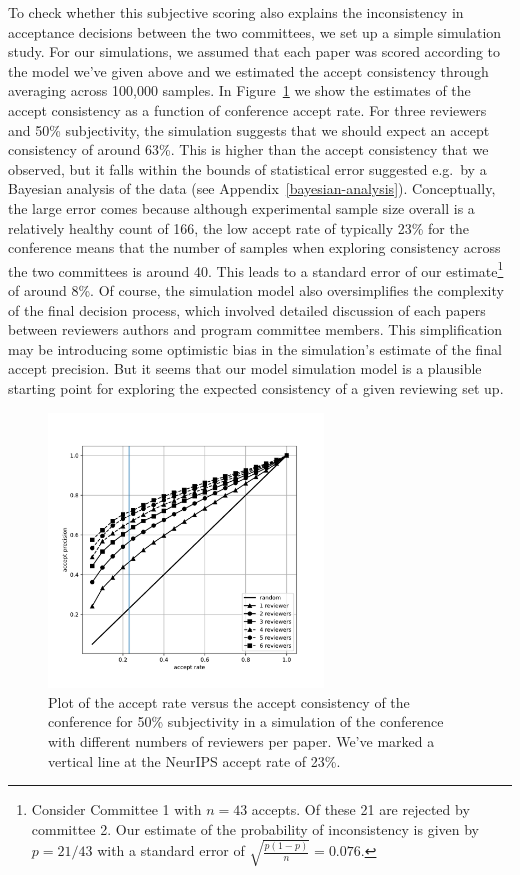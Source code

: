 \documentclass[twoside]{article}
\begin{document}
To check whether this subjective scoring also explains the
inconsistency in acceptance decisions between the two committees, we set up a
simple simulation study. For our simulations, we assumed that each
paper was scored according to the model we've given above and we
estimated the accept consistency through averaging across 100,000
samples. In Figure~\ref{figure-consistency-vs-accept-rate} we show the
estimates of the accept consistency as a function of conference accept
rate. For three reviewers and 50\% subjectivity, the simulation
suggests that we should expect an accept consistency of around
63\%. This is higher than the accept consistency that we observed, but
it falls within the bounds of statistical error suggested e.g.\ by a
Bayesian analysis of the data (see Appendix~\ref{bayesian-analysis}). Conceptually, the large error comes because
although experimental sample size overall is a relatively healthy count of 166,
the low accept rate of typically 23\% for the conference means that the number of
samples when exploring consistency across the two committees is around
40. This leads to a standard error of our
estimate\footnote{Consider Committee 1 with $n=43$ accepts. Of these
  21 are rejected by committee 2. Our estimate of the probability of
  inconsistency is given by $p=21/43$ with a standard error of
  $\sqrt{\frac{p(1-p)}{n}} = 0.076$.} of around 8\%.  Of course, the
simulation model also oversimplifies the complexity of the final
decision process, which involved detailed discussion of each papers
between reviewers authors and program committee members. This
simplification may be introducing some optimistic bias in the
simulation's estimate of the final accept precision. But it seems that
our model simulation model is a plausible starting point for exploring
the expected consistency of a given reviewing set up.

\begin{figure}[htb]
\centering
\includegraphics[width=0.65\textwidth]{diagrams/neurips/accept-precision-vs-accept-rate.pdf}

\caption{Plot of the accept rate versus the accept consistency of the
  conference for 50\% subjectivity in a simulation of the conference
  with different numbers of reviewers per paper. We've marked a vertical line at the NeurIPS accept rate of 23\%.}
\label{figure-consistency-vs-accept-rate}
\end{figure}
\end{document}
